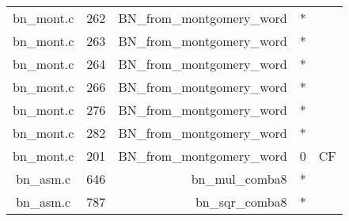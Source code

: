 \begin{table}
\begin{tabular}{clrrr}
bn\_mont.c& 262&BN\_from\_montgomery\_word&*&\\
bn\_mont.c& 263&BN\_from\_montgomery\_word&*&\\
bn\_mont.c& 264&BN\_from\_montgomery\_word&*&\\
bn\_mont.c& 266&BN\_from\_montgomery\_word&*&\\
bn\_mont.c& 276&BN\_from\_montgomery\_word&*&\\
bn\_mont.c& 282&BN\_from\_montgomery\_word&*&\\
bn\_mont.c& 201&BN\_from\_montgomery\_word&0 &CF\\
bn\_asm.c& 646&bn\_mul\_comba8&*&\\
bn\_asm.c& 787&bn\_sqr\_comba8&*&\\
\hline
\end{tabular}
\end{table}
